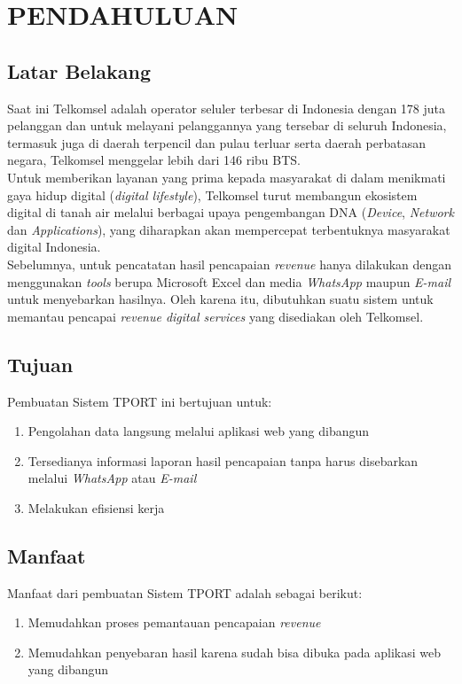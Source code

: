 \chapter{PENDAHULUAN}

\section{Latar Belakang}
\tab Saat ini Telkomsel adalah operator seluler terbesar di Indonesia dengan 178 juta pelanggan dan untuk melayani pelanggannya yang tersebar di seluruh Indonesia, termasuk juga di daerah terpencil dan pulau terluar serta daerah perbatasan negara, Telkomsel menggelar lebih dari 146 ribu BTS. \\
\tab Untuk memberikan layanan yang prima kepada masyarakat di dalam menikmati gaya hidup digital (\textit{digital lifestyle}), Telkomsel turut membangun ekosistem digital di tanah air melalui berbagai upaya pengembangan DNA (\textit{Device}, \textit{Network} dan \textit{Applications}), yang diharapkan akan mempercepat terbentuknya masyarakat digital Indonesia.\\
\tab Sebelumnya, untuk pencatatan hasil pencapaian \textit{revenue} hanya dilakukan dengan menggunakan \textit{tools} berupa Microsoft Excel dan media \textit{WhatsApp} maupun \textit{E-mail} untuk menyebarkan hasilnya. Oleh karena itu, dibutuhkan suatu sistem untuk memantau pencapai \textit{revenue digital services} yang disediakan oleh Telkomsel\cite{telkomsel}.

\section{Tujuan}
Pembuatan Sistem TPORT ini bertujuan untuk:
\begin{enumerate}
\item Pengolahan data langsung melalui aplikasi web yang dibangun
\item Tersedianya informasi laporan hasil pencapaian tanpa harus disebarkan melalui \textit{WhatsApp} atau \textit{E-mail}
\item Melakukan efisiensi kerja 
\end{enumerate}

\section{Manfaat}
Manfaat dari pembuatan Sistem TPORT adalah sebagai berikut:

\begin{enumerate}
	\item Memudahkan proses pemantauan pencapaian \textit{revenue}
	\item Memudahkan penyebaran hasil karena sudah bisa dibuka pada aplikasi web yang dibangun
\end{enumerate}

